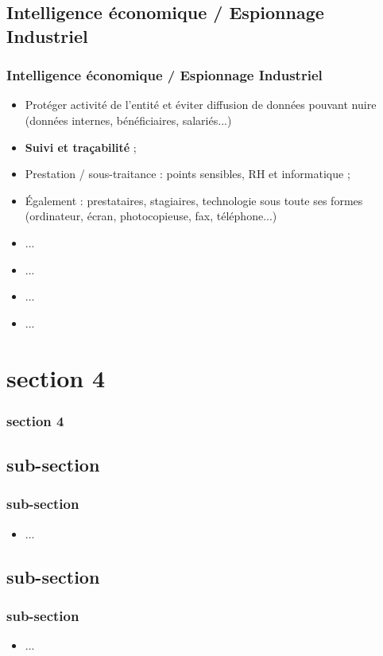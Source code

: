 \documentclass[slidetop,11pt]{beamer}
\begin{document}
\subsection{Intelligence {\'e}conomique / Espionnage Industriel}
\begin{frame}
	\frametitle{Intelligence {\'e}conomique / Espionnage Industriel}
	\begin{itemize}
		\item Prot{\'e}ger activit{\'e} de l'entit{\'e} et {\'e}viter diffusion de donn{\'e}es pouvant nuire (donn{\'e}es internes, b{\'e}n{\'e}ficiaires, salari{\'e}s...)
		\item \textbf{Suivi et tra\c{c}abilit{\'e}} ; 
		\item Prestation / sous-traitance : points sensibles, RH et informatique ; 
		\item {\'E}galement : prestataires, stagiaires, technologie sous toute ses formes (ordinateur, {\'e}cran, photocopieuse, fax, t{\'e}l{\'e}phone...)
		\item ...
		\item ...
		\item ...
		\item ...
	\end{itemize}
\end{frame}

\section{section 4}
\begin{frame}
	\frametitle{section 4}
	\tableofcontents[sections=4,currentsection,subsectionstyle=show/shaded/hide] %
\end{frame}

\subsection{sub-section}
\begin{frame}
	\frametitle{sub-section}
	\begin{itemize}
		\item ...
	\end{itemize}
\end{frame}

\subsection{sub-section}
\begin{frame}
	\frametitle{sub-section}
	\begin{itemize}
		\item ...
	\end{itemize}
\end{frame}
\end{document}
